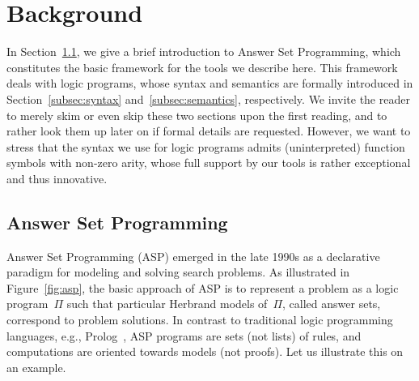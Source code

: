 \section{Background}\label{sec:background}

In Section~\ref{subsec:asp},
we give a brief introduction to Answer Set Programming,
which constitutes the basic framework for the tools we describe here.
This framework deals with logic programs,
whose syntax and semantics are formally introduced in
Section~\ref{subsec:syntax} and~\ref{subsec:semantics}, respectively.
We invite the reader to merely skim or even skip these two sections
upon the first reading, and to rather look them up later on if
formal details are requested.
However, we want to stress that the syntax we use for logic programs
admits (uninterpreted) function symbols with non-zero arity,
whose full support by our tools is rather exceptional and thus innovative.



\subsection{Answer Set Programming}\label{subsec:asp}

Answer Set Programming (ASP)
\cite{ankolisc05a,baral03a,gelleo02a,lifschitz02a,martru99a,niemela99a}
emerged in the late 1990s as a declarative paradigm
for modeling and solving search problems.
As illustrated in Figure~\ref{fig:asp},
the basic approach of ASP is to represent a problem as a logic program~$\Pi$
such that particular Herbrand models of~$\Pi$, called answer sets,
correspond to problem solutions.
In contrast to traditional logic programming languages,
e.g., Prolog~\cite{nilmal95a},
ASP programs are sets (not lists) of rules,
and computations are oriented towards models (not proofs).
Let us illustrate this on an example.

